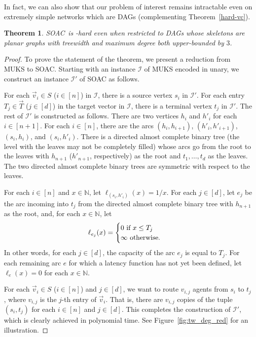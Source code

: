 \documentclass[letterpaper]{article} %
\newtheorem{theorem}{Theorem}
\newcommand{\problem}{{\sc SOAC}\xspace} %
\begin{document}
In fact, we can also show that our problem of interest remains intractable even on extremely simple networks which are DAGs (complementing Theorem~\ref{hard-vc}).

\begin{theorem}
\label{hard-tw-delta}
\problem\ is \NP-hard even when restricted to DAGs whose skeletons are planar graphs with treewidth and maximum degree both upper-bounded by $3$.
\end{theorem}

\begin{proof}
To prove the statement of the theorem, we present a reduction from \textsc{MUKS} to \problem.
Starting with an instance $\mathcal{I}$ of \textsc{MUKS} encoded in unary, we construct an instance $\mathcal{I}'$ of \problem{} as follows.

For each $\vec v_i \in S$ ($i\in [n]$) in $\mathcal{I}$, there is a source vertex $s_i$ in $\mathcal{I}'$.
For each entry $T_j\in \vec T$ ($j\in [d]$) in the target vector in $\mathcal{I}$, there is a terminal vertex $t_j$ in $\mathcal{I}'$.
The rest of $\mathcal{I}'$ is constructed as follows.
There are two vertices $h_i$ and $h'_i$ for each $i\in [n+1]$.
For each $i\in [n]$, there are the arcs $(h_i,h_{i+1})$, $(h'_i,h'_{i+1})$, $(s_i,h_i)$, and $(s_i,h'_i)$.
There is a directed almost complete binary tree (the level with the leaves may not be completely filled) whose arcs go from the root to the leaves with $h_{n+1}$ ($h'_{n+1}$, respectively) as the root and $t_1,\ldots,t_d$ as the leaves.
The two directed almost complete binary trees are symmetric with respect to the leaves.

For each $i\in [n]$ and $x\in \mathbb{N}$, let $\ell_{(s_i,h'_i)}(x) = 1/x$.
For each $j\in [d]$, let $e_j$ be the arc incoming into $t_j$ from the directed almost complete binary tree with $h_{n+1}$ as the root, and, for each $x\in \mathbb{N}$, let
\[
\ell_{e_j}(x) =
\begin{cases}
	0 $ if $ x \leq T_j \\
	\infty $ otherwise$.
\end{cases}
\]
In other words, for each $j\in [d]$, the capacity of the arc $e_j$ is equal to $T_j$.
For each remaining arc $e$ for which a latency function has not yet been defined, let $\ell_{e}(x) = 0$ for each $x\in \mathbb{N}$.

For each $\vec v_i \in S$ ($i\in [n]$) and $j\in [d]$, we want to route $v_{i,j}$ agents from $s_i$ to $t_j$, where $v_{i,j}$ is the $j$-th entry of $\vec v_i$.
That is, there are $v_{i,j}$ copies of the tuple $(s_i, t_j)$ for each $i\in [n]$ and $j\in [d]$.
This completes the construction of $\mathcal{I}'$, which is clearly achieved in polynomial time.
See Figure~\ref{fig:tw_deg_red} for an illustration.


\end{proof}
\end{document}
